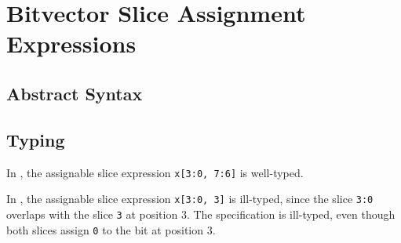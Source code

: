 \FormallyParagraph
\begin{mathpar}
\end{mathpar}

\hypertarget{def-slicelexprterm}{}
\section{Bitvector Slice Assignment Expressions\label{sec:BitvectorSliceAssignmentExpressions}}

\subsection{Abstract Syntax}
\BackupOriginalAST{
\begin{flalign*}
\lexpr \derives\ & \LESlice(\lexpr, \KleeneStar{\slice}) &
\end{flalign*}
}

\subsection{Typing}
In , the assignable slice expression \verb|x[3:0, 7:6]| is well-typed.

In , the assignable slice expression \verb|x[3:0, 3]| is ill-typed,
since the slice \verb|3:0| overlaps with the slice \verb|3| at position $3$.
The specification is ill-typed, even though both slices assign \verb|0| to the bit at position $3$.

